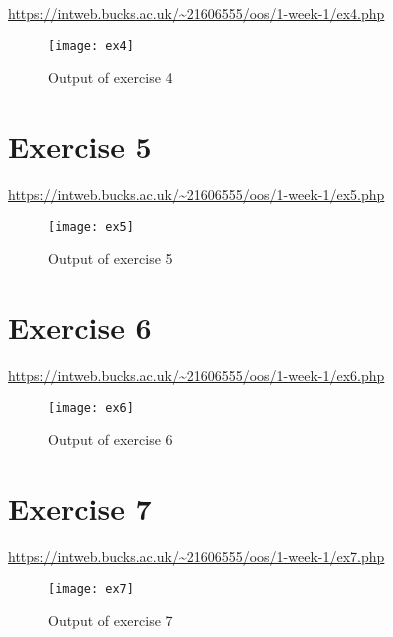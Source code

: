 \url{https://intweb.bucks.ac.uk/~21606555/oos/1-week-1/ex4.php}
\captionsetup{type=figure}


\begin{figure}[H]
  \caption{Output of exercise 4}
  \centering
  \texttt{[image: ex4]}
\end{figure}

\clearpage
\section{Exercise 5}

\url{https://intweb.bucks.ac.uk/~21606555/oos/1-week-1/ex5.php}
\captionsetup{type=figure}


\begin{figure}[H]
  \caption{Output of exercise 5}
  \centering
  \texttt{[image: ex5]}
\end{figure}

\section{Exercise 6}

\url{https://intweb.bucks.ac.uk/~21606555/oos/1-week-1/ex6.php}
\captionsetup{type=figure}


\begin{figure}[H]
  \caption{Output of exercise 6}
  \centering
  \texttt{[image: ex6]}
\end{figure}

\clearpage
\section{Exercise 7}

\url{https://intweb.bucks.ac.uk/~21606555/oos/1-week-1/ex7.php}
\captionsetup{type=figure}


\begin{figure}[H]
  \caption{Output of exercise 7}
  \centering
  \texttt{[image: ex7]}
\end{figure}
